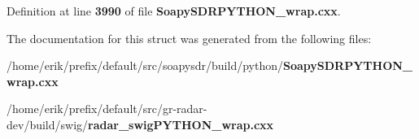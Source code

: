 Definition at line {\bf 3990} of file {\bf Soapy\+S\+D\+R\+P\+Y\+T\+H\+O\+N\+\_\+wrap.\+cxx}.



The documentation for this struct was generated from the following files\+:\begin{DoxyCompactItemize}
\item 
/home/erik/prefix/default/src/soapysdr/build/python/{\bf Soapy\+S\+D\+R\+P\+Y\+T\+H\+O\+N\+\_\+wrap.\+cxx}\item 
/home/erik/prefix/default/src/gr-\/radar-\/dev/build/swig/{\bf radar\+\_\+swig\+P\+Y\+T\+H\+O\+N\+\_\+wrap.\+cxx}\end{DoxyCompactItemize}

